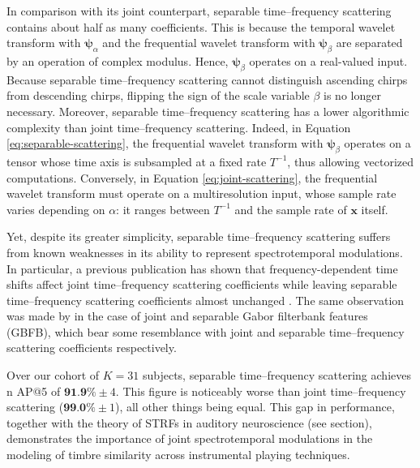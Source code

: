 \documentclass{bmcart}
\newcommand{\lnameref}[1]{%
\bgroup
\let\nmu\MakeLowercase
\nameref{#1}\egroup}
\newcommand{\nmu}{}
\begin{document}
In comparison with its joint counterpart, separable time--frequency scattering contains about half as many coefficients.
This is because the temporal wavelet transform with $\boldsymbol{\psi}_\alpha$ and the frequential wavelet transform with $\boldsymbol{\psi}_\beta$ are separated by an operation of complex modulus.
Hence, $\boldsymbol{\psi}_\beta$ operates on a real-valued input.
Because separable time--frequency scattering cannot distinguish ascending chirps from descending chirps, flipping the sign of the scale variable $\beta$ is no longer necessary.
Moreover, separable time--frequency scattering has a lower algorithmic complexity than joint time--frequency scattering.
Indeed, in Equation \ref{eq:separable-scattering}, the frequential wavelet transform with $\boldsymbol{\psi}_{\beta}$ operates on a tensor whose time axis is subsampled at a fixed rate $T^{-1}$, thus allowing vectorized computations.
Conversely, in Equation \ref{eq:joint-scattering}, the frequential wavelet transform must operate on a multiresolution input, whose sample rate varies  depending on $\alpha$: it ranges between $T^{-1}$ and the sample rate of $\boldsymbol{x}$ itself.

Yet, despite its greater simplicity, separable time--frequency scattering suffers from known weaknesses in its ability to represent spectrotemporal modulations.
In particular, a previous publication has shown that frequency-dependent time shifts affect joint time--frequency scattering coefficients while leaving separable time--frequency scattering coefficients almost unchanged \cite{anden2019tsp}.
The same observation was made by \cite{schadler2015jasa} in the case of joint and separable Gabor filterbank features (GBFB), which bear some resemblance with joint and separable time--frequency scattering coefficients respectively.

Over our cohort of $K=31$ subjects, separable time--frequency scattering achieves n AP@5 of $\textbf{91.9\%} \pm 4$. This figure is noticeably worse than joint time--frequency scattering ($\textbf{99.0}\% \pm 1$), all other things being equal.
This gap in performance, together with the theory of STRFs in auditory neuroscience (see \lnameref{sec:related-work} section), demonstrates the importance of joint spectrotemporal modulations in the modeling of timbre similarity across instrumental playing techniques.
\end{document}

